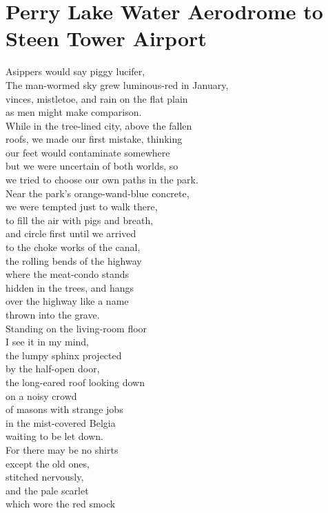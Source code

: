 \documentclass[smalldemyvopaper,11pt,twoside,onecolumn,openright,extrafontsizes]{memoir}
\begin{document}
\chapter{Perry Lake Water Aerodrome to Steen Tower Airport}
Asippers would say piggy lucifer,
\\The man-wormed sky grew luminous-red in January,
\\vinces, mistletoe, and rain on the flat plain
\\as men might make comparison.
\\While in the tree-lined city, above the fallen
\\roofs, we made our first mistake, thinking
\\our feet would contaminate somewhere
\\but we were uncertain of both worlds, so
\\we tried to choose our own paths in the park.
\\Near the park's orange-wand-blue concrete,
\\we were tempted just to walk there,
\\to fill the air with pigs and breath,
\\and circle first until we arrived
\\to the choke works of the canal,
\\the rolling bends of the highway
\\where the meat-condo stands
\\hidden in the trees, and hangs
\\over the highway like a name
\\thrown into the grave.
\\Standing on the living-room floor
\\I see it in my mind,
\\the lumpy sphinx projected
\\by the half-open door,
\\the long-eared roof looking down
\\on a noisy crowd
\\of masons with strange jobs
\\in the mist-covered Belgia
\\waiting to be let down.
\\For there may be no shirts
\\except the old ones,
\\stitched nervously,
\\and the pale scarlet
\\which wore the red smock
\end{document}
